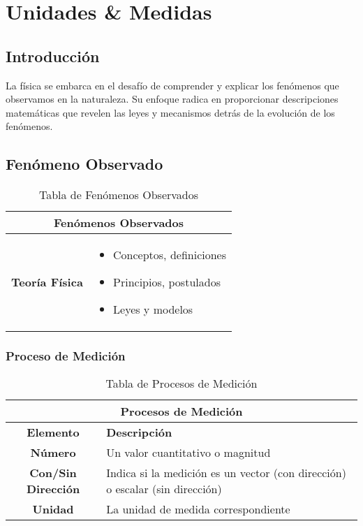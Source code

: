 \chapter{Unidades \& Medidas}

\section{Introducción}

La física se embarca en el desafío de comprender y explicar los fenómenos que observamos en la naturaleza. Su enfoque radica en proporcionar descripciones matemáticas que revelen las leyes y mecanismos detrás de la evolución de los fenómenos.

\section{Fenómeno Observado}

\begin{table}[h]
    \centering
    \renewcommand{\arraystretch}{1.5}
    \begin{tabular}{| m{3cm} | m{10cm} |}
        \hline
        \multicolumn{2}{|c|}{\textbf{Fenómenos Observados}} \\
        \hline
        \textbf{Teoría Física} & \begin{itemize}
            \item Conceptos, definiciones
            \item Principios, postulados
            \item Leyes y modelos
        \end{itemize} \\
        \hline
    \end{tabular}
    \caption{Tabla de Fenómenos Observados}
\end{table}

\subsection{Proceso de Medición}

\begin{table}[h]
    \centering
    \renewcommand{\arraystretch}{1.5}
    \begin{tabular}{|c|l|}
        \hline
        \multicolumn{2}{|c|}{\textbf{Procesos de Medición}} \\
        \hline
        \textbf{Elemento} & \textbf{Descripción} \\
        \hline
        \textbf{Número} & Un valor cuantitativo o magnitud \\
        \textbf{Con/Sin Dirección} & Indica si la medición es un vector (con dirección) o escalar (sin dirección) \\
        \textbf{Unidad} & La unidad de medida correspondiente \\
        \hline
    \end{tabular}
    \caption{Tabla de Procesos de Medición}
\end{table}

